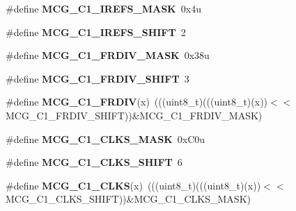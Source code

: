 \begin{DoxyCompactItemize}
\item 
\#define {\bfseries M\+C\+G\+\_\+\+C1\+\_\+\+I\+R\+E\+F\+S\+\_\+\+M\+A\+SK}~0x4u\hypertarget{group__MCG__Register__Masks_gadc14970d17e8ee736a16805a412a87fe}{}\label{group__MCG__Register__Masks_gadc14970d17e8ee736a16805a412a87fe}

\item 
\#define {\bfseries M\+C\+G\+\_\+\+C1\+\_\+\+I\+R\+E\+F\+S\+\_\+\+S\+H\+I\+FT}~2\hypertarget{group__MCG__Register__Masks_gada376a938782b95d20788418a2564476}{}\label{group__MCG__Register__Masks_gada376a938782b95d20788418a2564476}

\item 
\#define {\bfseries M\+C\+G\+\_\+\+C1\+\_\+\+F\+R\+D\+I\+V\+\_\+\+M\+A\+SK}~0x38u\hypertarget{group__MCG__Register__Masks_gac7762b84f41121882f4d1fbcaa839aeb}{}\label{group__MCG__Register__Masks_gac7762b84f41121882f4d1fbcaa839aeb}

\item 
\#define {\bfseries M\+C\+G\+\_\+\+C1\+\_\+\+F\+R\+D\+I\+V\+\_\+\+S\+H\+I\+FT}~3\hypertarget{group__MCG__Register__Masks_gaee124d0ce81f6e815dbbcac62440708b}{}\label{group__MCG__Register__Masks_gaee124d0ce81f6e815dbbcac62440708b}

\item 
\#define {\bfseries M\+C\+G\+\_\+\+C1\+\_\+\+F\+R\+D\+IV}(x)~(((uint8\+\_\+t)(((uint8\+\_\+t)(x))$<$$<$M\+C\+G\+\_\+\+C1\+\_\+\+F\+R\+D\+I\+V\+\_\+\+S\+H\+I\+FT))\&M\+C\+G\+\_\+\+C1\+\_\+\+F\+R\+D\+I\+V\+\_\+\+M\+A\+SK)\hypertarget{group__MCG__Register__Masks_ga39519f6e6a3b433988eca107d0e7d460}{}\label{group__MCG__Register__Masks_ga39519f6e6a3b433988eca107d0e7d460}

\item 
\#define {\bfseries M\+C\+G\+\_\+\+C1\+\_\+\+C\+L\+K\+S\+\_\+\+M\+A\+SK}~0x\+C0u\hypertarget{group__MCG__Register__Masks_gae9a1db29d56ef219e4df3dc9d945b08e}{}\label{group__MCG__Register__Masks_gae9a1db29d56ef219e4df3dc9d945b08e}

\item 
\#define {\bfseries M\+C\+G\+\_\+\+C1\+\_\+\+C\+L\+K\+S\+\_\+\+S\+H\+I\+FT}~6\hypertarget{group__MCG__Register__Masks_ga9ca1068f336097a94984ba4bba0798d6}{}\label{group__MCG__Register__Masks_ga9ca1068f336097a94984ba4bba0798d6}

\item 
\#define {\bfseries M\+C\+G\+\_\+\+C1\+\_\+\+C\+L\+KS}(x)~(((uint8\+\_\+t)(((uint8\+\_\+t)(x))$<$$<$M\+C\+G\+\_\+\+C1\+\_\+\+C\+L\+K\+S\+\_\+\+S\+H\+I\+FT))\&M\+C\+G\+\_\+\+C1\+\_\+\+C\+L\+K\+S\+\_\+\+M\+A\+SK)\hypertarget{group__MCG__Register__Masks_gaffe61ac58c90dfaebbd4748c0dea558c}{}\label{group__MCG__Register__Masks_gaffe61ac58c90dfaebbd4748c0dea558c}


\end{DoxyCompactItemize}
